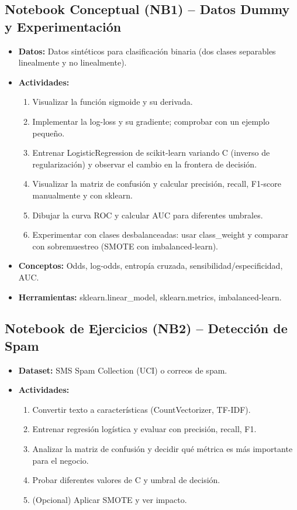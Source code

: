 \documentclass[12pt,a4paper]{article}
\begin{document}
\subsection*{Notebook Conceptual (NB1) – Datos Dummy y Experimentación}
\begin{itemize}
    \item \textbf{Datos:} Datos sintéticos para clasificación binaria (dos clases separables linealmente y no linealmente).
    \item \textbf{Actividades:}
    \begin{enumerate}
        \item Visualizar la función sigmoide y su derivada.
        \item Implementar la log-loss y su gradiente; comprobar con un ejemplo pequeño.
        \item Entrenar LogisticRegression de scikit-learn variando C (inverso de regularización) y observar el cambio en la frontera de decisión.
        \item Visualizar la matriz de confusión y calcular precisión, recall, F1-score manualmente y con sklearn.
        \item Dibujar la curva ROC y calcular AUC para diferentes umbrales.
        \item Experimentar con clases desbalanceadas: usar class\_weight y comparar con sobremuestreo (SMOTE con imbalanced-learn).
    \end{enumerate}
    \item \textbf{Conceptos:} Odds, log-odds, entropía cruzada, sensibilidad/especificidad, AUC.
    \item \textbf{Herramientas:} sklearn.linear\_model, sklearn.metrics, imbalanced-learn.
\end{itemize}

\subsection*{Notebook de Ejercicios (NB2) – Detección de Spam}
\begin{itemize}
    \item \textbf{Dataset:} SMS Spam Collection (UCI) o correos de spam.
    \item \textbf{Actividades:}
    \begin{enumerate}
        \item Convertir texto a características (CountVectorizer, TF-IDF).
        \item Entrenar regresión logística y evaluar con precisión, recall, F1.
        \item Analizar la matriz de confusión y decidir qué métrica es más importante para el negocio.
        \item Probar diferentes valores de C y umbral de decisión.
        \item (Opcional) Aplicar SMOTE y ver impacto.
    \end{enumerate}
\end{itemize}
\end{document}

